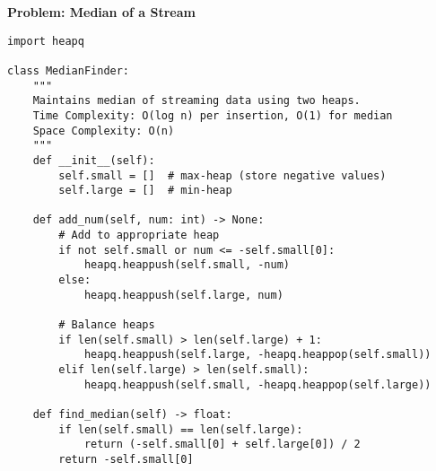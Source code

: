 \noindent\textbf{Problem: Median of a Stream}
\begin{verbatim}
import heapq

class MedianFinder:
    """
    Maintains median of streaming data using two heaps.
    Time Complexity: O(log n) per insertion, O(1) for median
    Space Complexity: O(n)
    """
    def __init__(self):
        self.small = []  # max-heap (store negative values)
        self.large = []  # min-heap

    def add_num(self, num: int) -> None:
        # Add to appropriate heap
        if not self.small or num <= -self.small[0]:
            heapq.heappush(self.small, -num)
        else:
            heapq.heappush(self.large, num)
        
        # Balance heaps
        if len(self.small) > len(self.large) + 1:
            heapq.heappush(self.large, -heapq.heappop(self.small))
        elif len(self.large) > len(self.small):
            heapq.heappush(self.small, -heapq.heappop(self.large))

    def find_median(self) -> float:
        if len(self.small) == len(self.large):
            return (-self.small[0] + self.large[0]) / 2
        return -self.small[0]
\end{verbatim}

% 
